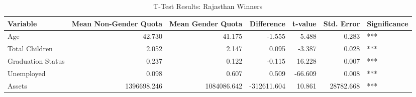 \begin{table}

\caption{T-Test Results: Rajasthan Winners}
\centering
\begin{tabular}[t]{l|r|r|r|r|r|l}
\hline
\textbf{Variable} & \textbf{Mean Non-Gender Quota} & \textbf{Mean Gender Quota} & \textbf{Difference} & \textbf{t-value} & \textbf{Std. Error} & \textbf{Significance}\\
\hline
Age & 42.730 & 41.175 & -1.555 & 5.488 & 0.283 & ***\\
\hline
Total Children & 2.052 & 2.147 & 0.095 & -3.387 & 0.028 & ***\\
\hline
Graduation Status & 0.237 & 0.122 & -0.115 & 16.228 & 0.007 & ***\\
\hline
Unemployed & 0.098 & 0.607 & 0.509 & -66.609 & 0.008 & ***\\
\hline
Assets & 1396698.246 & 1084086.642 & -312611.604 & 10.861 & 28782.668 & ***\\
\hline
\end{tabular}
\end{table}
